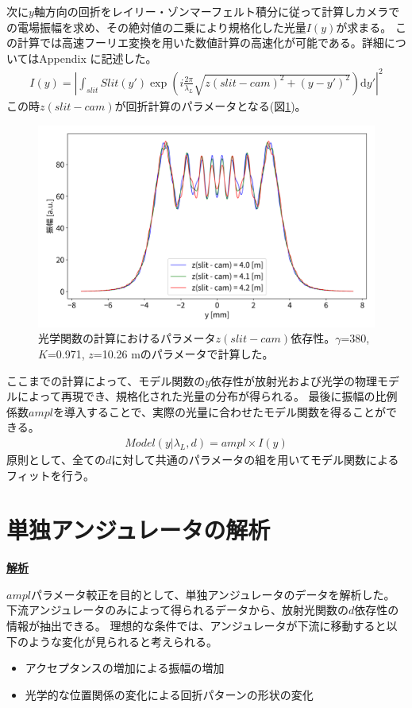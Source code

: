 \documentclass[a4paper,11pt,uplatex]{jsbook}
\begin{document}
次に$y$軸方向の回折をレイリー・ゾンマーフェルト積分に従って計算しカメラでの電場振幅を求め、その絶対値の二乗により規格化した光量$I(y)$が求まる。
この計算では高速フーリエ変換を用いた数値計算の高速化が可能である。詳細についてはAppendix に記述した。
\begin{align}
  I(y) = \left| \int_{slit} Slit(y')\exp(i\frac{2\pi}{\lambda_L} \sqrt{z(slit-cam)^2 + (y-y')^2})\text{d}y' \right|^2 
\end{align}
この時$z(slit-cam)$が回折計算のパラメータとなる(図\ref{zp})。
\begin{figure}[H]
  \centering
  \includegraphics[width = 0.8\linewidth]{image/2-zp.png}
  \caption[光学関数のスリット-カメラ間距離]{光学関数の計算におけるパラメータ$z(slit-cam)$依存性。$\gamma$=380, $K$=0.971, $z$=10.26 mのパラメータで計算した。}\label{zp}
\end{figure}

ここまでの計算によって、モデル関数の$y$依存性が放射光および光学の物理モデルによって再現でき、規格化された光量の分布が得られる。
最後に振幅の比例係数$ampl$を導入することで、実際の光量に合わせたモデル関数を得ることができる。
\begin{align}
  Model(y|\lambda_L,d) = ampl \times I(y) 
\end{align}
原則として、全ての$d$に対して共通のパラメータの組を用いてモデル関数によるフィットを行う。

\section{単独アンジュレータの解析}
\noindent \textbf{\underline{解析}}\par
$ampl$パラメータ較正を目的として、単独アンジュレータのデータを解析した。
下流アンジュレータのみによって得られるデータから、放射光関数の$d$依存性の情報が抽出できる。
理想的な条件では、アンジュレータが下流に移動すると以下のような変化が見られると考えられる。
\begin{itemize}
  \item アクセプタンスの増加による振幅の増加
  \item 光学的な位置関係の変化による回折パターンの形状の変化
\end{itemize}
\end{document}
